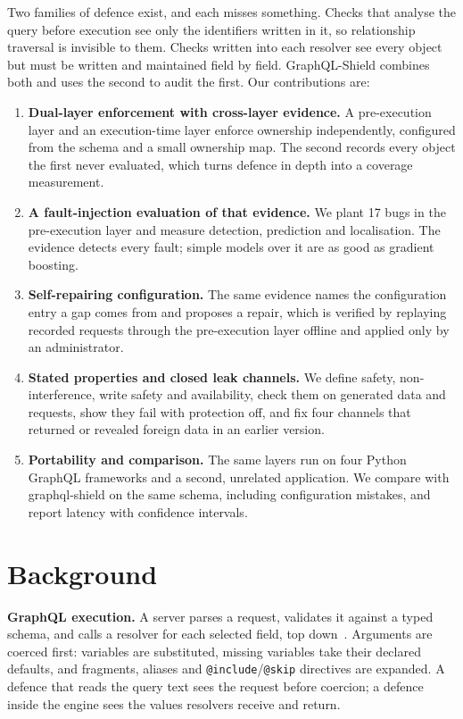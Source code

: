\documentclass[conference]{IEEEtran}
\newcommand{\code}[1]{\texttt{\small #1}}
\begin{document}
Two families of defence exist, and each misses something. Checks that analyse the query before execution see only the identifiers written in it, so relationship traversal is invisible to them. Checks written into each resolver see every object but must be written and maintained field by field. GraphQL-Shield combines both and uses the second to audit the first. Our contributions are:
\begin{enumerate}
\item \textbf{Dual-layer enforcement with cross-layer evidence.} A pre-execution layer and an execution-time layer enforce ownership independently, configured from the schema and a small ownership map. The second records every object the first never evaluated, which turns defence in depth into a coverage measurement.
\item \textbf{A fault-injection evaluation of that evidence.} We plant 17 bugs in the pre-execution layer and measure detection, prediction and localisation. The evidence detects every fault; simple models over it are as good as gradient boosting.
\item \textbf{Self-repairing configuration.} The same evidence names the configuration entry a gap comes from and proposes a repair, which is verified by replaying recorded requests through the pre-execution layer offline and applied only by an administrator.
\item \textbf{Stated properties and closed leak channels.} We define safety, non-interference, write safety and availability, check them on generated data and requests, show they fail with protection off, and fix four channels that returned or revealed foreign data in an earlier version.
\item \textbf{Portability and comparison.} The same layers run on four Python GraphQL frameworks and a second, unrelated application. We compare with graphql-shield on the same schema, including configuration mistakes, and report latency with confidence intervals.
\end{enumerate}

\section{Background}

\textbf{GraphQL execution.} A server parses a request, validates it against a typed schema, and calls a resolver for each selected field, top down~\cite{hartig2018}. Arguments are coerced first: variables are substituted, missing variables take their declared defaults, and fragments, aliases and \code{@include}/\code{@skip} directives are expanded. A defence that reads the query text sees the request before coercion; a defence inside the engine sees the values resolvers receive and return.
\end{document}
